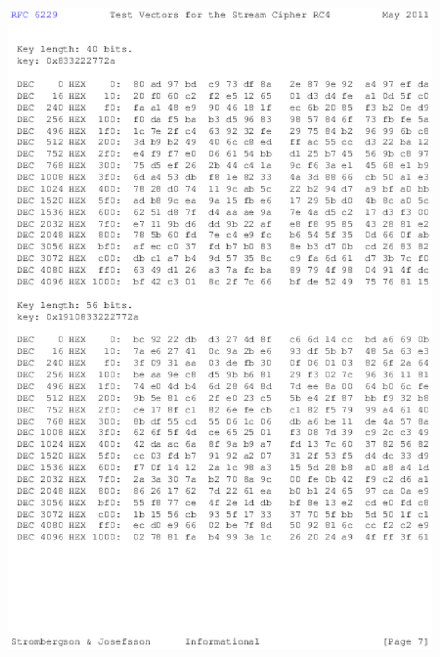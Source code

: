 \begin{anexosenv}
\begin{figure}
\centering
\includegraphics{figuras/file-6}
\end{figure}


\end{anexosenv}
